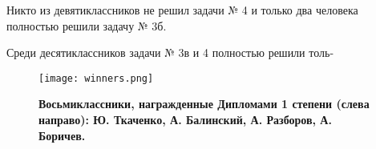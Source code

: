 \begin{minipage}[10cm]{\textwidth}
\begin{multicols*}{2}
Никто из девятиклассников не решил задачи № 4 и только два человека полностью решили задачу № 3б.
    
Среди десятиклассников задачи № 3в и 4 полностью решили толь-
    \end{multicols*}
\end{minipage}

\begin{SCfigure}[][h]
\caption{\textbf{Восьмиклассники, награжденные Дипломами 1 степени (слева направо): Ю. Ткаченко, А. Балинский, А. Разборов, А. Боричев.}}
\texttt{[image: winners.png]}
\end{SCfigure}